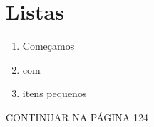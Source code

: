 \chapter{Listas}
\begin{enumerate}
\item Começamos
\item com
\item itens pequenos
\end{enumerate}

CONTINUAR NA PÁGINA 124
\newpage

